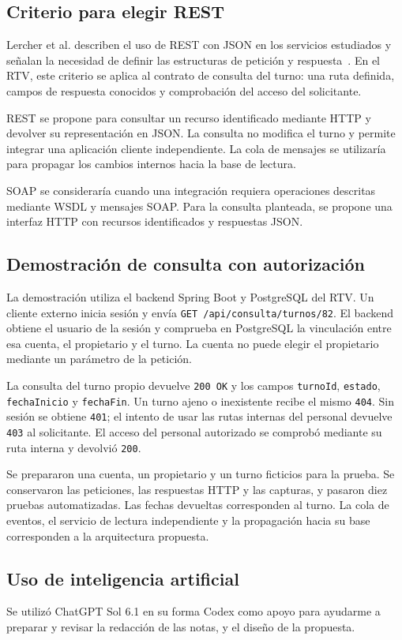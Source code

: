 \subsection{Criterio para elegir REST}
Lercher et al. describen el uso de REST con JSON en los servicios estudiados y señalan la necesidad de definir las estructuras de petición y respuesta~\cite[sec.~3.2.1]{lercher_microservice_2024}. En el RTV, este criterio se aplica al contrato de consulta del turno: una ruta definida, campos de respuesta conocidos y comprobación del acceso del solicitante.

REST se propone para consultar un recurso identificado mediante HTTP y devolver su representación en JSON. La consulta no modifica el turno y permite integrar una aplicación cliente independiente. La cola de mensajes se utilizaría para propagar los cambios internos hacia la base de lectura.

SOAP se consideraría cuando una integración requiera operaciones descritas mediante WSDL y mensajes SOAP. Para la consulta planteada, se propone una interfaz HTTP con recursos identificados y respuestas JSON.

\subsection{Demostración de consulta con autorización}
La demostración utiliza el backend Spring Boot y PostgreSQL del RTV. Un cliente externo inicia sesión y envía \texttt{GET /api/consulta/turnos/82}. El backend obtiene el usuario de la sesión y comprueba en PostgreSQL la vinculación entre esa cuenta, el propietario y el turno. La cuenta no puede elegir el propietario mediante un parámetro de la petición.

La consulta del turno propio devuelve \texttt{200 OK} y los campos \texttt{turnoId}, \texttt{estado}, \texttt{fechaInicio} y \texttt{fechaFin}. Un turno ajeno o inexistente recibe el mismo \texttt{404}. Sin sesión se obtiene \texttt{401}; el intento de usar las rutas internas del personal devuelve \texttt{403} al solicitante. El acceso del personal autorizado se comprobó mediante su ruta interna y devolvió \texttt{200}.

Se prepararon una cuenta, un propietario y un turno ficticios para la prueba. Se conservaron las peticiones, las respuestas HTTP y las capturas, y pasaron diez pruebas automatizadas. Las fechas devueltas corresponden al turno. La cola de eventos, el servicio de lectura independiente y la propagación hacia su base corresponden a la arquitectura propuesta.

\subsection{Uso de inteligencia artificial}
Se utilizó ChatGPT Sol 6.1 en su forma Codex como apoyo para ayudarme a preparar y revisar la redacción de las notas, y el diseño de la propuesta.
